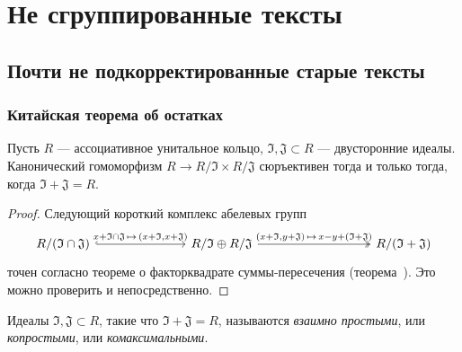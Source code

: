 \documentclass[
	extrafontsizes,
	11pt,
	hyphens,
]{memoir}
\begin{document}
\part{Не сгруппированные тексты}



\chapter{Почти не подкорректированные старые тексты}


\section{Китайская теорема об остатках}

\begin{lemma}
\label{lem:gen_chi_rem}
Пусть \(R\) --- ассоциативное унитальное кольцо, \(\mathfrak{I}, \mathfrak{J} \subset R\) --- двусторонние идеалы.
Канонический гомоморфизм \(R \to R/\mathfrak{I} \times R/\mathfrak{J}\) сюръективен тогда и только тогда, когда \(\mathfrak{I} + \mathfrak{J} = R\).
\end{lemma}

\begin{proof}
Следующий короткий комплекс абелевых групп
\begin{equation*}
\begin{tikzcd}[column sep = scriptsize]
R / (\mathfrak{I} \cap \mathfrak{J})
\ar[hookrightarrow]{rrrr}{x + \mathfrak{I} \cap \mathfrak{J} \,\mapsto\, (x + \mathfrak{I}, x + \mathfrak{J})}
& & & &
R/\mathfrak{I} \oplus R/\mathfrak{J}
\ar[twoheadrightarrow]{rrrrr}{(x + \mathfrak{I}, y + \mathfrak{J}) \,\mapsto\, x - y + (\mathfrak{I} + \mathfrak{J})}
& & & & &
R / (\mathfrak{I} + \mathfrak{J})
\end{tikzcd}
\end{equation*}
точен согласно теореме о факторквадрате сум\-мы-пе\-ре\-се\-че\-ния (теорема~). Это можно проверить и непосредственно.
\end{proof}

\begin{remark}
Идеалы \(\mathfrak{I}, \mathfrak{J} \subset R\), такие что \(\mathfrak{I} + \mathfrak{J} = R\), называются \emph{взаимно простыми}, или \emph{копростыми}, или \emph{комаксимальными}.
\end{remark}
\end{document}
